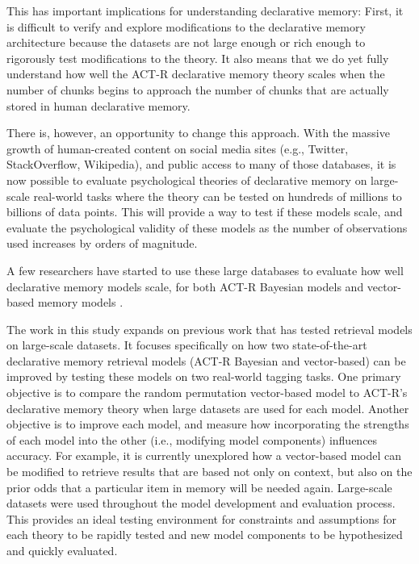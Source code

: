 \documentclass[man,floatsintext,donotrepeattitle]{apa6}
\begin{document}
This has important implications for understanding declarative memory:
First, it is difficult to verify and explore modifications to the declarative memory architecture because the datasets are not large enough or rich enough to rigorously test modifications to the theory.
It also means that we do yet fully understand how well the ACT-R declarative memory theory scales when the number of chunks begins to approach the number of chunks that are actually stored in human declarative memory.

There is, however, an opportunity to change this approach.
With the massive growth of human-created content on social media sites (e.g., Twitter, StackOverflow, Wikipedia), and public access to many of those databases,
it is now possible to evaluate psychological theories of declarative memory on large-scale real-world tasks where the theory can be tested on hundreds of millions to billions of data points.
This will provide a way to test if these models scale, and evaluate the psychological validity of these models as the number of observations used increases by orders of magnitude.

A few researchers have started to use these large databases to evaluate how well declarative memory models scale,
for both ACT-R Bayesian models \parencites{Fu2007,Pirolli2003,Stanley2013,Douglass2010} and vector-based memory models \parencites{Jones2007,Rutledge2008,Recchia2010,Sahlgren2008}.

The work in this study expands on previous work that has tested retrieval models on large-scale datasets.
It focuses specifically on how two state-of-the-art declarative memory retrieval models (ACT-R Bayesian and vector-based) can be improved by testing these models on two real-world tagging tasks.
One primary objective is to compare the random permutation vector-based model to ACT-R's declarative memory theory when large datasets are used for each model. 
Another objective is to improve each model, and measure how incorporating the strengths of each model into the other (i.e., modifying model components) influences accuracy.
For example, it is currently unexplored how a vector-based model can be modified to retrieve results that are based not only on context, but also on the prior odds that a particular item in memory will be needed again.
Large-scale datasets were used throughout the model development and evaluation process.
This provides an ideal testing environment for constraints and assumptions for each theory to be rapidly tested and new model components to be hypothesized and quickly evaluated.
\end{document}
